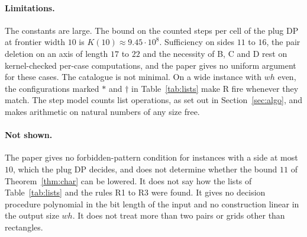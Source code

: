 \documentclass[11pt]{article}
\makeatletter
\newcommand{\ent}[1]{\textsf{#1}}
\newcommand{\secmark}[1]{\pdfsavepos\protected@write\@auxout{}{\string\secpos{#1}{\thepage}{\noexpand\the\noexpand\pdflastypos}}}
\def\secpos#1#2#3{}
\makeatother
\begin{document}
\paragraph{Limitations.} The constants are large. The bound on the counted steps per cell of the
plug DP at frontier width $10$ is $K(10)\approx 9.45\cdot 10^{8}$. Sufficiency on sides $11$ to
$16$, the pair deletion on an axis of length $17$ to $22$ and the necessity of \ent{B}, \ent{C}
and \ent{D} rest on kernel-checked per-case computations, and the paper gives no uniform argument for these cases. The catalogue is not
minimal. On a wide instance with $wh$ even, the configurations marked $*$ and $\dagger$ in
Table~\ref{tab:lists} make \ent{R} fire whenever they match. The step model counts list
operations, as set out in Section~\ref{sec:algo}, and makes arithmetic on natural numbers of any
size free.

\paragraph{Not shown.} The paper gives no forbidden-pattern condition for instances with a side at
most $10$, which the plug DP decides, and does not determine whether the bound $11$ of
Theorem~\ref{thm:char} can be lowered. It does not say how the lists of Table~\ref{tab:lists} and
the rules \ent{R1} to \ent{R3} were found. It gives no decision procedure polynomial in the bit
length of the input and no construction linear in the output size $wh$. It does not treat more
than two pairs or grids other than rectangles.
\secmark{end}




\end{document}
